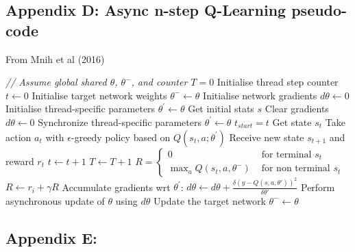 \documentclass{article}
\begin{document}
\subsection*{Appendix D: Async n-step Q-Learning pseudo-code}
\label{async_q_n_step_pseudo}

From Mnih et al (2016)

\begin{algorithmic}[1]
\State \textit{// Assume global shared  $\theta$, $\theta^{-}$, and counter $T = 0$}
\State Initialise thread step counter $t \gets 0$
\State Initialise target network weights $\theta^{-} \gets \theta$
\State Initialise network gradients $d\theta \gets 0$
\State Initialise thread-specific parameters $\theta^\prime \gets \theta$
\State Get initial stats $s$
    \State Clear gradients $d\theta \gets 0$
    \State Synchronize thread-specific parameters $\theta^\prime \gets \theta$
    \State $t_{start} = t$
    \State Get state $s_t$
        \State Take action $a_t$ with $\epsilon$-greedy policy based on $Q\left(s_t,a;\theta^\prime\right)$
        \State Receive new state $s_{t+1}$ and reward $r_t$
        \State $t \gets t + 1$
        \State $T \gets T + 1$
    \EndWhile
    \State $R= \begin{cases}0 & \text { for terminal } s_t \\ \max _{a} Q\left(s_t, a, \theta^{-}\right) & \text { for non terminal } s_t\end{cases}$
        \State $R \gets r_i + \gamma R$
        \State Accumulate gradients wrt $\theta^\prime$: $d\theta \gets d\theta + \frac{\delta\left( y-Q\left(s, a, \theta\prime\right)\right)^{2}}{\delta\theta\prime}$
    \EndFor
    \State Perform asynchronous update of $\theta$ using $d\theta$
        \State Update the target network $\theta^{-} \gets \theta$
    \EndIf
\EndWhile

\end{algorithmic}


\subsection*{Appendix E: }
\end{document}
